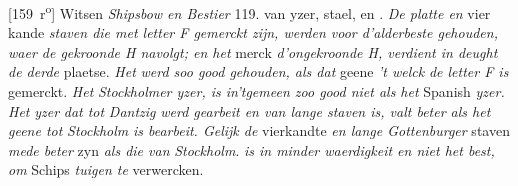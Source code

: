 [159~r\textsuperscript{o}] Witsen\protect{} \textit{Shipsbow en Bestier}  119.  van yzer\protect{}, stael\protect{}, en . \textit{De platte en} vier kande \textit{staven die met letter F gemerckt zijn, werden voor d'alderbeste gehouden, waer de gekroonde H navolgt; en het} merck \textit{d'ongekroonde H, verdient in deught de derde} plaetse.
\pend 
\pstart \textit{ Het }\textit{}\protect{}\textit{ werd soo good gehouden, als dat} geene \textit{'t welck}  \textit{de letter F is} gemerckt.
\pend 
\pstart \textit{ Het }\textit{Stockholmer yzer}\protect{}\textit{, is in'tgemeen zoo good niet als het} Spanish \textit{yzer}\protect{}\textit{. Het }\textit{yzer}\protect{}\textit{ dat tot }\textit{Dantzig}\protect{}\textit{ werd gearbeit en van lange staven is, valt beter als het geene tot }\textit{Stockholm}\protect{}\textit{ is bearbeit. Gelijk de} vierkandte \textit{en lange Gottenburger} staven \textit{mede beter} zyn \textit{als die van }\textit{Stockholm}\protect{}.\pend 
\pstart {}\textit{}\protect{}\textit{ is in minder waerdigkeit en niet het best, om } Schips \textit{tuigen te} verwercken.
\pend 
